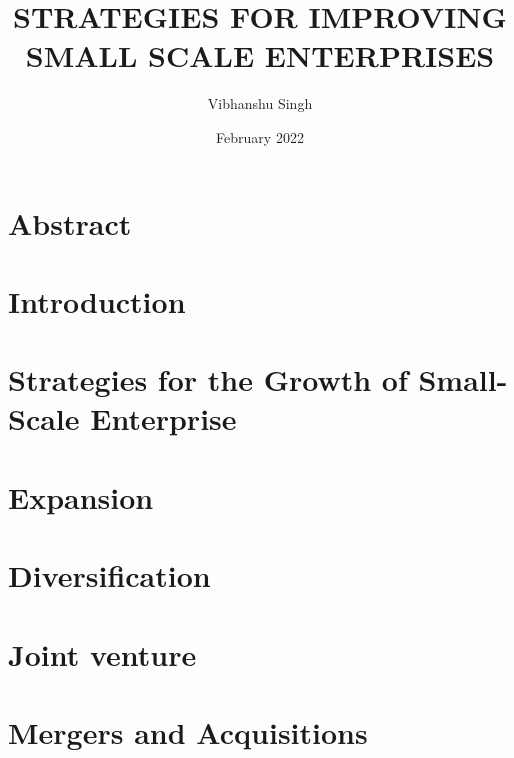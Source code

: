 \documentclass{article}
\title{STRATEGIES FOR IMPROVING SMALL SCALE ENTERPRISES}
\author{Vibhanshu Singh}
\date{February 2022}
\begin{document}
\maketitle

\section{Abstract}
\section{Introduction}
\section{Strategies for the Growth of Small-Scale Enterprise}
\section{Expansion}
\section{Diversification}
\section{Joint venture}
\section{Mergers and Acquisitions}

\newpage
\end{document}
